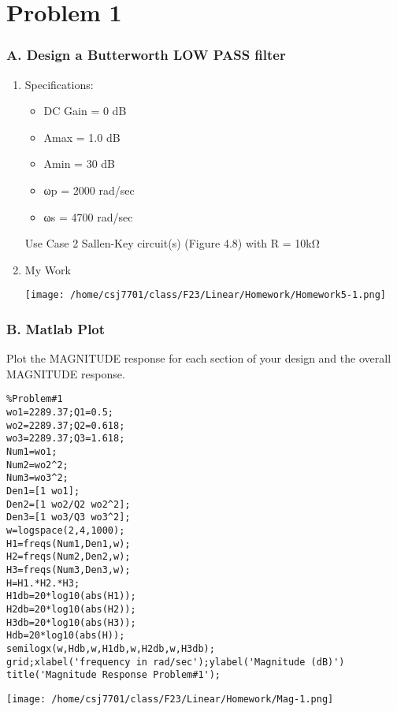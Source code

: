 \documentclass[11pt]{article}
\author{Christian}
\date{\today}
\title{}
\begin{document}
\tableofcontents

\section{Problem 1}
\label{sec:orgaf1f1e2}
\subsubsection{A. Design a Butterworth LOW PASS filter}
\label{sec:org92a1ed8}
\begin{enumerate}
\item Specifications:
\label{sec:orgbe4fcbe}
\begin{itemize}
\item DC Gain = 0 dB
\item Amax = 1.0 dB
\item Amin = 30 dB
\item ωp = 2000 rad/sec
\item ωs = 4700 rad/sec
\end{itemize}
Use Case 2 Sallen-Key circuit(s) (Figure 4.8) with R = 10kΩ
\item My Work
\label{sec:orge4674f1}
\begin{center}
\texttt{[image: /home/csj7701/class/F23/Linear/Homework/Homework5-1.png]}
\end{center}
\end{enumerate}
\subsubsection{B. Matlab Plot}
\label{sec:org79528de}
Plot the MAGNITUDE response for each section of your design and the overall MAGNITUDE response.

\begin{verbatim}
%Problem#1
wo1=2289.37;Q1=0.5;
wo2=2289.37;Q2=0.618;
wo3=2289.37;Q3=1.618;
Num1=wo1;
Num2=wo2^2;
Num3=wo3^2;
Den1=[1 wo1];
Den2=[1 wo2/Q2 wo2^2];
Den3=[1 wo3/Q3 wo3^2];
w=logspace(2,4,1000);
H1=freqs(Num1,Den1,w);
H2=freqs(Num2,Den2,w);
H3=freqs(Num3,Den3,w);
H=H1.*H2.*H3;
H1db=20*log10(abs(H1));
H2db=20*log10(abs(H2));
H3db=20*log10(abs(H3));
Hdb=20*log10(abs(H));
semilogx(w,Hdb,w,H1db,w,H2db,w,H3db);
grid;xlabel('frequency in rad/sec');ylabel('Magnitude (dB)')
title('Magnitude Response Problem#1');
\end{verbatim}

\begin{center}
\texttt{[image: /home/csj7701/class/F23/Linear/Homework/Mag-1.png]}
\end{center}
\end{document}

